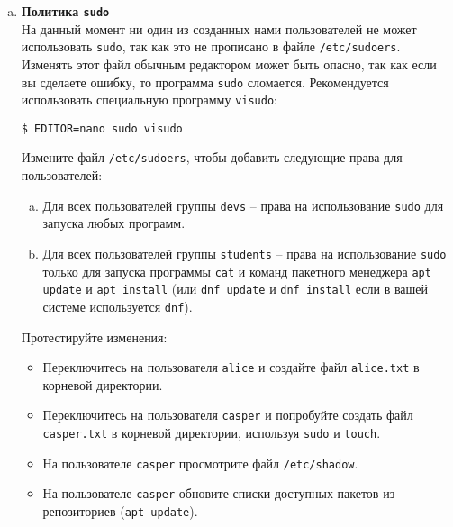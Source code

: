 \documentclass{article}
\begin{document}
\begin{enumerate}[a.]
\item \textbf{Политика \texttt{sudo}}\\
На данный момент ни один из созданных нами пользователей не может использовать \texttt{sudo}, так как это не прописано в файле \texttt{/etc/sudoers}. Изменять этот файл обычным редактором может быть опасно, так как если вы сделаете ошибку, то программа \texttt{sudo} сломается. Рекомендуется использовать специальную программу \texttt{visudo}:
\begin{lstlisting}
$ EDITOR=nano sudo visudo
\end{lstlisting}

Измените файл \texttt{/etc/sudoers}, чтобы добавить следующие права для пользователей:
\begin{enumerate}[(a)]
\item Для всех пользователей группы \texttt{devs} -- права на использование \texttt{sudo} для запуска любых программ.
\item Для всех пользователей группы \texttt{students} -- права на использование \texttt{sudo} только для запуска программы \texttt{cat} и команд пакетного менеджера \texttt{apt update} и \texttt{apt install} (или \texttt{dnf update} и \texttt{dnf install} если в вашей системе используется \texttt{dnf}).
\end{enumerate}
Протестируйте изменения:
\begin{itemize}
\item Переключитесь на пользователя \texttt{alice} и создайте файл \texttt{alice.txt} в корневой директории.
\item Переключитесь на пользователя \texttt{casper} и попробуйте создать файл \texttt{casper.txt} в корневой директории, используя \texttt{sudo} и \texttt{touch}.
\item На пользователе \texttt{casper} просмотрите файл \texttt{/etc/shadow}.
\item На пользователе \texttt{casper} обновите списки доступных пакетов из репозиториев (\texttt{apt update}).
\end{itemize}

\end{enumerate}
\end{document}
